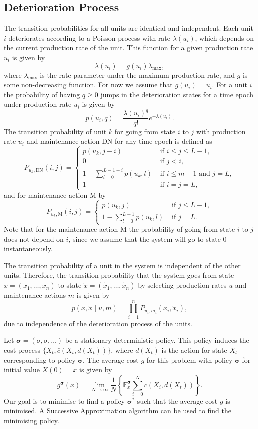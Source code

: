 \documentclass[a4paper,11pt]{article}
\begin{document}
\subsection{Deterioration Process}
The transition probabilities for all units are identical and independent. Each unit $i$ deteriorates according to a Poisson process with rate $\lambda(u_i)$, which depends on the current production rate of the unit. This function for a given production rate $u_i$ is given by
$$
\lambda(u_i) = g(u_i) \lambda_{\text{max}},
$$
where $\lambda_{\text{max}}$ is the rate parameter under the maximum production rate, and $g$ is some non-decreasing function. For now we assume that $g(u_i) = u_i$. For a unit $i$ the probability of having $q \geq 0$ jumps in the deterioration states for a time epoch under production rate $u_i$ is given by
$$
p(u_i,q) = \frac{\lambda(u_i)^q}{q!}e^{-\lambda(u_i)}.
$$
The transition probability of unit $k$ for going from state $i$ to $j$ with production rate $u_i$ and maintenance action DN for any time epoch is defined as
$$
P_{u_k,\text{DN}}(i,j) = \begin{cases}
p(u_k, j-i) &\text{ if } i \leq j \leq L-1, \\
0 &\text{ if } j < i, \\
1 - \sum_{l=0}^{L-1-i}p(u_k,l) & \text{ if } i \leq m-1  \text{ and } j = L, \\
1 & \text{ if } i = j = L,
\end{cases}
$$
and for maintenance action M by
$$
P_{u_k,\text{M}}(i,j) = \begin{cases}
	p(u_k, j) &\text{ if } j \leq  L-1, \\
	1 - \sum_{l=0}^{L-1}p(u_k,l) & \text{ if } j = L.
\end{cases}
$$
Note that for the maintenance action M the probability of going from state $i$ to $j$ does not depend on $i$, since we assume that the system will go to state 0 instantaneously.

The transition probability of a unit in the system is independent of the other units. Therefore, the transition probability that the system goes from state $x = (x_1, \dots, x_n)$ to state $\tilde{x} = (\tilde{x}_1, \dots, \tilde{x}_n)$ by selecting production rates $u$ and maintenance actions $m$ is given by
$$
p(x, \tilde{x} \mid u, m) = \prod_{i = 1}^nP_{u_i,m_i}(x_i, \tilde{x}_i),
$$
due to independence of the deterioration process of the units.

Let $\boldsymbol{\sigma} = (\sigma, \sigma, \dots)$ be a stationary deterministic policy. This policy induces the cost process $\{X_t, \bar{c}(X_t, d(X_t))\}$, where $d(X_t)$ is the action for state $X_t$ corresponding to policy $\boldsymbol{\sigma}$. The average cost $g$ for this problem with policy $\boldsymbol{\sigma}$ for initial value $X(0) = x$ is given by
$$
g^{\boldsymbol{\sigma}}(x) = \lim_{N \to \infty}\frac{1}{N}\left \{\mathbb{E}^{\boldsymbol{\sigma}}_x \sum_{i=0}^N\bar{c}(X_i, d(X_t)) \right\}.
$$
Our goal is to minimise to find a policy $\boldsymbol{\sigma}^*$ such that the average cost $g$ is minimised. A Successive Approximation algorithm can be used to find the minimising policy.
\end{document}
